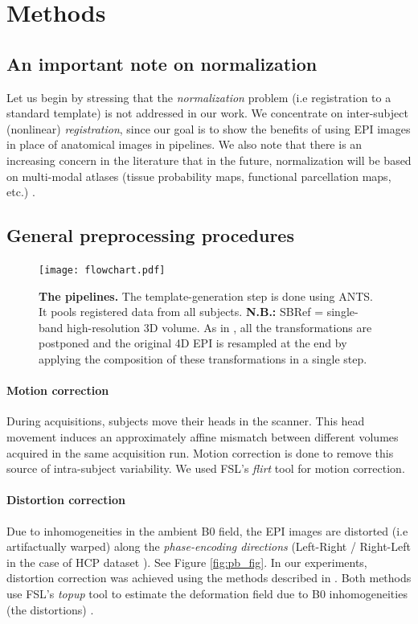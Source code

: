 \section{Methods}
\subsection{An important note on normalization}
Let us begin by stressing that the \textit{normalization} problem (i.e
registration to a standard template) is not addressed in our work. We
concentrate on inter-subject (nonlinear) \textit{registration}, since
our goal is to show the benefits of using EPI images in place of
anatomical images in pipelines. 
%
We also note that there is an increasing concern in the literature
that in the future, normalization will be based on multi-modal atlases
(tissue probability maps, functional parcellation maps, etc.)
\cite{pmid24936682}.
\subsection{General preprocessing procedures}
\begin{figure}[!htbp]
     \texttt{[image: flowchart.pdf]}
\caption{\textbf{The pipelines.} The template-generation step is done using ANTS. It pools registered data from all subjects. \textbf{N.B.:} SBRef = single-band high-resolution 3D volume. As in \cite{glasser2013}, all the transformations are postponed and the original 4D EPI is resampled at the end by applying the composition of these transformations in a single step.}
\label{fig:pipelines}
\end{figure}

\label{sec:gen_proc}
\paragraph{Motion correction}
During acquisitions, subjects move their heads in the
scanner. This head movement induces an approximately affine mismatch
between different volumes acquired in the same acquisition
run. Motion correction is done to remove this source of intra-subject
variability.
We used FSL's \textit{flirt} tool \cite{smith2004} for motion correction.

\paragraph{Distortion correction}
\label{sec:dc}
Due to inhomogeneities in the ambient B0 field,
the EPI images are distorted (i.e artifactually warped) along the \textit{phase-encoding
  directions} (Left-Right / Right-Left in the case of HCP dataset
\cite{VanEssen20122222}). See Figure \ref{fig:pb_fig}. In our
experiments, distortion correction \cite{pmid9178246,pmid12270226,zeng2002,anderson2003,jezzard1995correction,wan1997reduction} was
achieved using %
the methods described in \cite{VanEssen20122222}. %
Both methods use  FSL's \textit{topup} tool \cite{smith2004} to
estimate the deformation field due to B0 inhomogeneities (the
distortions) \cite{glasser2013}.

